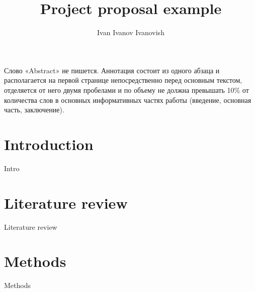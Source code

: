 \documentclass[PI]{ProjectProposal}
\title{Project proposal example}
\author{Ivan Ivanov Ivanovish}
\begin{document}
\maketitle
Слово «Abstract» не пишется. Аннотация состоит из одного абзаца и располагается на первой странице непосредственно перед основным текстом, отделяется от него двумя пробелами и по объему не должна превышать 10\% от количества слов в основных информативных частях работы (введение, основная часть, заключение).
\chapter*{Introduction}
Intro \cite{HSEDocuments}
\chapter*{Literature review}
Literature review
\chapter*{Methods}
Methods
\putbibliography
\end{document}
